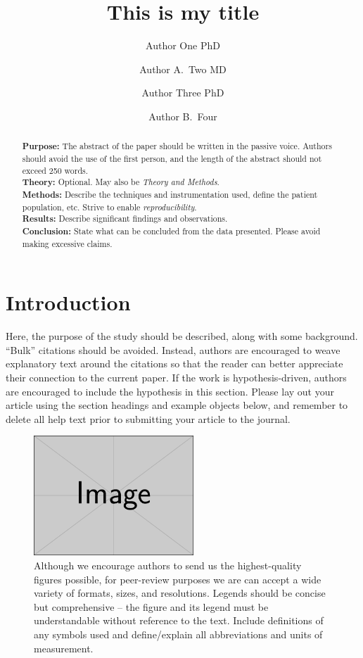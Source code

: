 \documentclass[num-refs]{wiley-article}
\title{This is my title}
\author[1\authfn{1}]{Author One PhD}
\author[2\authfn{1}]{Author A.~Two MD}
\author[2\authfn{2}]{Author Three PhD}
\author[2]{Author B.~Four}
\affil[1]{Department, Institution, City, State or Province, Postal Code, Country}
\affil[2]{Department, Institution, City, State or Province, Postal Code, Country}
\begin{document}
\maketitle

\begin{abstract}
\textbf{Purpose:}
The abstract of the paper should be written in the passive voice. 
Authors should avoid the use of the first person, and the length of the abstract should not exceed 250 words.\\
\textbf{Theory:}
Optional. May also be \emph{Theory and Methods}.\\
\textbf{Methods:}
Describe the techniques and instrumentation used, define the patient population, etc. 
Strive to enable \emph{reproducibility}.\\
\textbf{Results:}
Describe significant findings and observations.\\
\textbf{Conclusion:}
State what can be concluded from the data presented. 
Please avoid making excessive claims.

\end{abstract}

\section{Introduction}
Here, the purpose of the study should be described, along with some background.
“Bulk” citations should be avoided. 
Instead, authors are encouraged to weave explanatory text around the citations so that the reader can better appreciate their connection to the current paper. 
If the work is hypothesis-driven, authors are encouraged to include the hypothesis in this section.
Please lay out your article using the section headings and example objects below, and remember to delete all help text prior to submitting your article to the journal.

\begin{figure}[bt]
\centering
\includegraphics[width=6cm]{example-image-rectangle}
\caption{
    Although we encourage authors to send us the highest-quality figures possible, for peer-review purposes we are can accept a wide variety of formats, sizes, and resolutions. 
    Legends should be concise but comprehensive – the figure and its legend must be understandable without reference to the text. 
    Include definitions of any symbols used and define/explain all abbreviations and units of measurement.
}
\end{figure}
\end{document}
